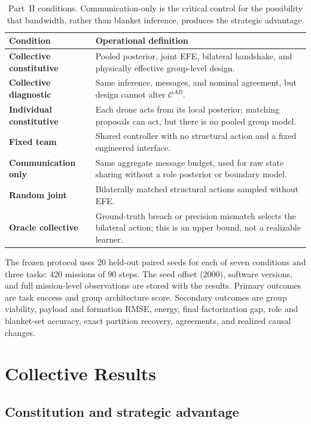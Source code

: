 \documentclass[11pt,a4paper]{article}
\numberwithin{equation}{section}
\newcommand{\Corg}{\mathcal{C}}
\begin{document}
\begin{table}[t]
\centering
\small
\begin{tabularx}{\textwidth}{>{\bfseries}lX}
\toprule
Condition & Operational definition \\
\midrule
Collective constitutive & Pooled posterior, joint EFE, bilateral handshake,
and physically effective group-level design. \\
Collective diagnostic & Same inference, messages, and nominal agreement, but
design cannot alter $\Corg^{AB}$. \\
Individual constitutive & Each drone acts from its local posterior; matching
proposals can act, but there is no pooled group model. \\
Fixed team & Shared controller with no structural action and a fixed
engineered interface. \\
Communication only & Same aggregate message budget, used for raw state
sharing without a role posterior or boundary model. \\
Random joint & Bilaterally matched structural actions sampled without EFE. \\
Oracle collective & Ground-truth breach or precision mismatch selects the
bilateral action; this is an upper bound, not a realizable learner. \\
\bottomrule
\end{tabularx}
\caption{Part~II conditions. Communication-only is the critical control for
the possibility that bandwidth, rather than blanket inference, produces the
strategic advantage.}
\label{tab:collective-conditions}
\end{table}

The frozen protocol uses 20 held-out paired seeds for each of seven
conditions and three tasks: 420 missions of 90 steps. The seed offset (2000),
software versions, and full mission-level observations are stored with the
results. Primary outcomes are task success and group architecture score.
Secondary outcomes are group viability, payload and formation RMSE, energy,
final factorization gap, role and blanket-set accuracy, exact partition
recovery, agreements, and realized causal changes.

\section{Collective Results}

\subsection{Constitution and strategic advantage}
\end{document}
